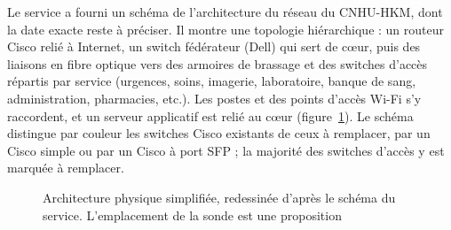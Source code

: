 Le service a fourni un schéma de l'architecture du réseau du CNHU-HKM\cite{archi}, dont la date exacte reste à préciser. Il montre une topologie hiérarchique : un routeur Cisco relié à Internet, un switch fédérateur (Dell) qui sert de cœur, puis des liaisons en fibre optique vers des armoires de brassage et des switches d'accès répartis par service (urgences, soins, imagerie, laboratoire, banque de sang, administration, pharmacies, etc.). Les postes et des points d'accès Wi-Fi s'y raccordent, et un serveur applicatif est relié au cœur (figure~\ref{fig:existant}). Le schéma distingue par couleur les switches Cisco existants de ceux à remplacer, par un Cisco simple ou par un Cisco à port SFP ; la majorité des switches d'accès y est marquée à remplacer.

\begin{figure}[htbp]
\centering
\small
{}
\caption{Architecture physique simplifiée, redessinée d'après le schéma du service\cite{archi}. L'emplacement de la sonde est une proposition}
\label{fig:existant}
\end{figure}

